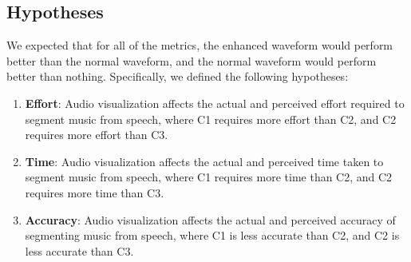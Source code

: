 
\subsection{Hypotheses}

We expected that for all of the metrics, the enhanced waveform would perform better than the normal waveform, and
the normal waveform would perform better than nothing. Specifically, we defined the following hypotheses:

\newcommand{\subscript}[2]{$#1 _ #2$}
\begin{enumerate}[label=H\arabic*.]
  \item \textbf{Effort}: Audio visualization affects the actual and perceived effort required to segment music from
    speech, where C1 requires more effort than C2, and C2 requires more effort than C3.
  \item \textbf{Time}: Audio visualization affects the actual and perceived time taken to segment music from speech,
    where C1 requires more time than C2, and C2 requires more time than C3.
  \item \textbf{Accuracy}: Audio visualization affects the actual and perceived accuracy of segmenting music from
    speech, where C1 is less accurate than C2, and C2 is less accurate than C3.
\end{enumerate}


